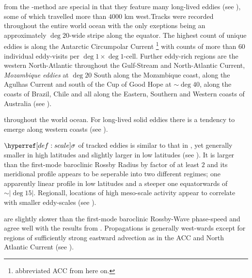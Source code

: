 \newcommand{\run}[1]{#1-aviI}
\newcommand{\RUN}{\aviI:\;}
 from the \MI -method are special in that they feature many long-lived eddies (see ),
some of which travelled more than $4000$ km west.Tracks were recorded throughout the entire world ocean with the only exeptions being an approximately $\deg{20}$-wide stripe along the equator. The highest count of unique eddies is along the Antarctic Circumpolar Current \footnote{abbreviated ACC from here on.} with counts of more than $60$ individual eddy-visits per $\deg{1} \times \deg{1}$-cell. Further eddy-rich regions are the western North-Atlantic throughout the Gulf-Stream and North-Atlantic Current, \textit{Mozambique eddies} \citep{schouten2003eddies} at $\deg{20}$ South along the Mozambique coast, along the Agulhas Current and south of the Cup of Good Hope at $\sim \deg{40}$, along the coasts of Brazil, Chile and all along the Eastern, Southern and Western coasts of Australia (see ).

  throughout the world ocean. For long-lived solid eddies there is a tendency to emerge along western coasts (see ).

 $\scale$ of tracked eddies is similar to that in \citet{them}, yet generally smaller in high latitudes and slightly larger in low latitudes (see ). It is larger than the first-mode baroclinic Rossby Radius by factor of at least $2$ and its meridional profile appears to be seperable into two different regimes; one apparently linear profile in low latitudes and a steeper one equatorwards of $\sim \left| \deg{15} \right|$. Regionall, locations of high meso-scale activity appear to correlate with smaller eddy-scales (see ).

 are slightly slower than the first-mode baroclinic Rossby-Wave phase-speed and agree well with the results from \citet{them}. Propagations is generally west-wards except for regions of sufficiently strong eastward advection as in the ACC and North Atlantic Current (see ).

